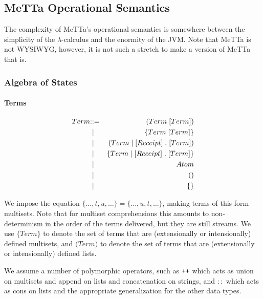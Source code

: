 \subsection{MeTTa Operational Semantics}
The complexity of MeTTa's operational semantics is somewhere between the simplicity of the $\lambda$-calculus and the enormity of the JVM. Note that MeTTa is not WYSIWYG, however, it is not such a stretch to make a version of MeTTa that is.

\subsubsection{Algebra of States}


\paragraph{Terms}
\begin{eqnarray*}
  Term & \mathbin{\mathbf{::=}} & \mathsf{(} Term \; [Term] \mathsf{)} \\
  & \;\mathbin{\mathbf\mid}\; & \mathsf{\{} Term \; [Term] \mathsf{\}} \\
  & \;\mathbin{\mathbf\mid}\; & \mathsf{(} Term{} \;\mathsf{|}\; [Receipt] \; \mathsf{.} \; [Term] \mathsf{)} \\
  & \;\mathbin{\mathbf\mid}\; & \mathsf{\{} Term \;\mathsf{|}\; [Receipt] \; \mathsf{.} \; [Term] \mathsf{\}} \\
  & \;\mathbin{\mathbf\mid}\; & Atom \\
  & \;\mathbin{\mathbf\mid}\; & () \\
  & \;\mathbin{\mathbf\mid}\; & \{\} \\
\end{eqnarray*}

We impose the equation $\mathsf{\{} \ldots, t, u, \ldots \mathsf{\}} = \mathsf{\{} \ldots, u, t, \ldots \mathsf{\}}$, making terms of this form multisets. Note that for multiset comprehensions this amounts to non-determinism in the order of the terms delivered, but they are still streams. We use $\mathsf{\{}Term\mathsf{\}}$ to denote the set of terms that are (extensionally or intensionally) defined multisets, and $\mathsf{(}Term\mathsf{)}$ to denote the set of terms that are (extensionally or intensionally) defined lists.

We assume a number of polymorphic operators, such as $\mathbin{\text{\ttfamily\upshape ++}}$ which acts as union on multisets and append on lists and concatenation on strings, and $::$ which acts as cons on lists and the appropriate generalization for the other data types.

